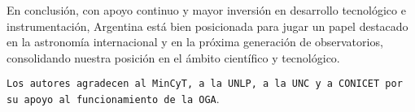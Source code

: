 \documentclass[baaa]{baaa}
\begin{document}
En conclusión, con apoyo continuo y mayor inversión en desarrollo tecnológico e instrumentación, Argentina está bien posicionada para jugar un papel destacado en la astronomía internacional y en la próxima generación de observatorios, consolidando nuestra posición en el ámbito científico y tecnológico.


\begin{acknowledgement}
\texttt{Los autores agradecen al MinCyT, a la UNLP, a la UNC y a CONICET por su apoyo al funcionamiento de la OGA}.
\end{acknowledgement}



%
%
 
\end{document}
